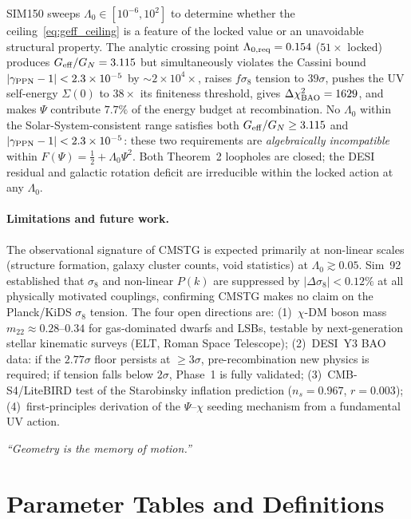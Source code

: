 \documentclass[12pt,a4paper]{article}
\begin{document}
SIM150 sweeps $\Lambda_0\in[10^{-6},10^2]$ to determine whether the
ceiling~\eqref{eq:geff_ceiling} is a feature of the locked value or an
unavoidable structural property.  The analytic crossing point
$\Lambda_{0,{\rm req}}=0.154$ ($51\times$ locked) produces $G_{\rm
eff}/G_N=3.115$ but simultaneously violates the Cassini bound
$|\gamma_{\rm PPN}-1|<2.3\times10^{-5}$ by $\sim2\times10^4\times$, raises
$f\sigma_8$ tension to $39\sigma$, pushes the UV self-energy $\Sigma(0)$
to $38\times$ its finiteness threshold, gives $\Delta\chi^2_{\rm BAO}=1629$,
and makes $\Psi$ contribute $7.7\%$ of the energy budget at recombination.
No $\Lambda_0$ within the Solar-System-consistent range satisfies both
$G_{\rm eff}/G_N\geq3.115$ and $|\gamma_{\rm PPN}-1|<2.3\times10^{-5}$:
these two requirements are \emph{algebraically incompatible} within
$F(\Psi)=\tfrac{1}{2}+\Lambda_0\Psi^2$.  Both Theorem~2 loopholes are
closed; the DESI residual and galactic rotation deficit are irreducible within
the locked action at any $\Lambda_0$.

\paragraph{Limitations and future work.}
The observational signature of CMSTG is expected primarily at non-linear
scales (structure formation, galaxy cluster counts, void statistics)
at $\Lambda_0 \gtrsim 0.05$. Sim~92 established that $\sigma_8$ and
non-linear $P(k)$ are suppressed by $|\Delta\sigma_8| < 0.12\%$ at all
physically motivated couplings, confirming CMSTG makes no claim on the
Planck/KiDS $\sigma_8$ tension.  The four open directions are:
(1)~$\chi$-DM boson mass $m_{22}\approx0.28$--$0.34$ for gas-dominated dwarfs
and LSBs, testable by next-generation stellar kinematic surveys
(ELT, Roman Space Telescope);
(2)~DESI~Y3 BAO data: if the $2.77\sigma$ floor persists at $\geq3\sigma$,
pre-recombination new physics is required; if tension falls below $2\sigma$,
Phase~1 is fully validated;
(3)~CMB-S4/LiteBIRD test of the Starobinsky inflation prediction
($n_s=0.967$, $r=0.003$);
(4)~first-principles derivation of the $\Psi$--$\chi$ seeding mechanism from
a fundamental UV action.

\emph{``Geometry is the memory of motion.''}

\appendix

\section{Parameter Tables and Definitions}
\label{app:params}
\end{document}
